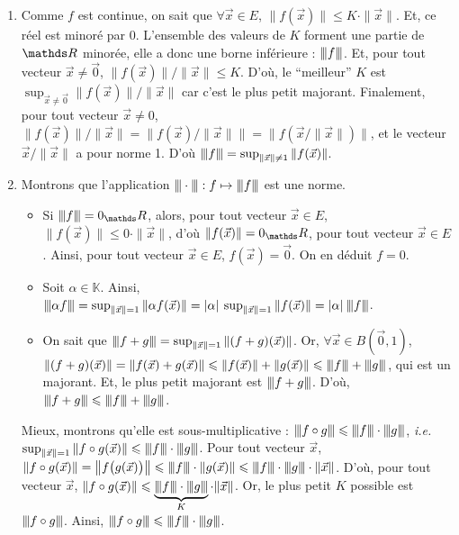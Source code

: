 \begin{prv}
	\begin{enumerate}
		\item Comme $f$\/ est continue, on sait que $\forall \vec{x} \in E$, $\|f(\vec{x})\| \le K\cdot \|\vec{x}\|$. Et, ce réel est minoré par $0$. L'ensemble des valeurs de $K$ forment une partie de $\R$ minorée, elle a donc une borne inférieure : $\sub f$. Et, pour tout vecteur $\vec{x} \neq \vec{0}$, $\|f(\vec{x})\| / \|\vec{x}\| \le K$. D'où, le ``meilleur'' $K$ est $\sup_{\vec{x} \neq \vec{0}} \|f(\vec{x})\| / \|\vec{x}\|$ car c'est le plus petit majorant.
			Finalement, pour tout vecteur $\vec{x} \neq 0$, $\|f(\vec{x})\| / \|\vec{x}\| = \big\|f(\vec{x}) / \|\vec{x}\|\big\| = \big\|f(\vec{x} / \|\vec{x}\|) \big\|$, et le vecteur $\vec{x} / \|\vec{x}\|$ a pour norme 1. D'où $\sub f = \sup_{\|\vec{x}\| \neq 1} \|f(\vec{x})\|$.
		\item Montrons que l'application $\sub \cdot : f \mapsto \sub f$\/ est une norme.
			\begin{itemize}
				\item Si $\sub f = 0_\R$, alors, pour tout vecteur $\vec{x} \in E$, $\|f(\vec{x})\| \le 0 \cdot \|\vec{x}\|$, d'où $\|f(\vec{x})\| = 0_\R$, pour tout vecteur $\vec{x} \in E$. Ainsi, pour tout vecteur $\vec{x} \in E$, $f(\vec{x}) = \vec{0}$. On en déduit $f = 0$.
				\item Soit $\alpha \in \mathds{K}$. Ainsi, $\sub {\alpha f} = \sup_{\|\vec{x}\| = 1} \|\alpha f(\vec{x})\| = |\alpha| \: \sup_{\|\vec{x}\| = 1} \|f(\vec{x})\| = |\alpha|\: \sub f$.
				\item On sait que $\sub {f + g} = \sup_{\|\vec{x}\| = 1} \|(f + g)(\vec{x})\|$. Or, $\forall \vec{x} \in B(\vec{0}, 1)$, $\|(f+g)(\vec{x})\| = \|f(\vec{x}) + g(\vec{x})\| \le \|f(\vec{x})\| + \|g(\vec{x})\| \le \sub f + \sub g$, qui est un majorant.
					Et, le plus petit majorant est $\sub {f + g}$. D'où, $\sub{f + g} \le \sub f + \sub g$.
			\end{itemize}
			Mieux, montrons qu'elle est sous-multiplicative : $\sub {f \circ g} \le \sub f \cdot \sub g$, \textit{i.e.} $\sup_{\|\vec{x}\| = 1} \|f  \circ g(\vec{x})\| \le \sub f \cdot \sub g$.
			Pour tout vecteur $\vec{x}$, $\|f  \circ g(\vec{x})\| = \big\|f\big(g(\vec{x})\big)\big\| \le \sub f \cdot \|g(\vec{x})\| \le \sub f \cdot \sub g \cdot \|\vec{x}\|$.
			D'où, pour tout vecteur $\vec{x}$, $\|f \circ g(\vec{x})\| \le \underbrace{\sub f \cdot \sub g}_K \cdot \|\vec{x}\|$. Or, le plus petit $K$ possible est $\sub {f \circ g}$. Ainsi, $\sub {f  \circ g} \le \sub f \cdot \sub g$.
	\end{enumerate}
\end{prv}

